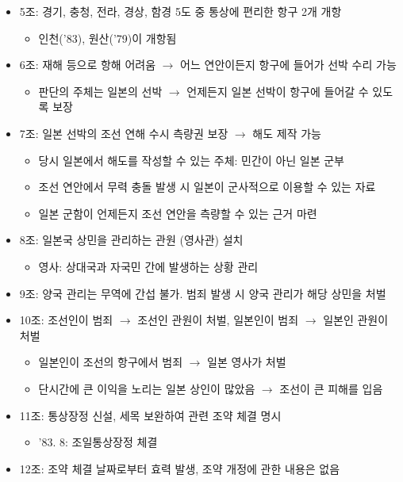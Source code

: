\begin{itemize}
\begin{itemize}
    \end{itemize}
    \newpage
    \item 5조: 경기, 충청, 전라, 경상, 함경 5도 중 통상에 편리한 항구 2개 개항
    \begin{itemize}
        \item 인천('83), 원산('79)이 개항됨
    \end{itemize}
    \item 6조: 재해 등으로 항해 어려움 $\rightarrow$ 어느 연안이든지 항구에 들어가 선박 수리 가능
    \begin{itemize}
        \item 판단의 주체는 일본의 선박 $\rightarrow$ 언제든지 일본 선박이 항구에 들어갈 수 있도록 보장
    \end{itemize}
    \item 7조: 일본 선박의 조선 연해 수시 측량권 보장 $\rightarrow$ 해도 제작 가능
    \begin{itemize}
        \item 당시 일본에서 해도를 작성할 수 있는 주체: 민간이 아닌 일본 군부
        \item 조선 연안에서 무력 충돌 발생 시 일본이 군사적으로 이용할 수 있는 자료
        \item 일본 군함이 언제든지 조선 연안을 측량할 수 있는 근거 마련
    \end{itemize}
    \item 8조: 일본국 상민을 관리하는 관원 (영사관) 설치
    \begin{itemize}
        \item 영사: 상대국과 자국민 간에 발생하는 상황 관리
    \end{itemize}
    \item 9조: 양국 관리는 무역에 간섭 불가. 범죄 발생 시 양국 관리가 해당 상민을 처벌
    \item 10조: 조선인이 범죄 $\rightarrow$ 조선인 관원이 처벌, 일본인이 범죄 $\rightarrow$ 일본인 관원이 처벌
    \begin{itemize}
        \item 일본인이 조선의 항구에서 범죄 $\rightarrow$ 일본 영사가 처벌
        \item 단시간에 큰 이익을 노리는 일본 상인이 많았음 $\rightarrow$ 조선이 큰 피해를 입음
    \end{itemize}
    \item 11조: 통상장정 신설, 세목 보완하여 관련 조약 체결 명시
    \begin{itemize}
        \item '83. 8: 조일통상장정 체결
    \end{itemize}
    \item 12조: 조약 체결 날짜로부터 효력 발생, 조약 개정에 관한 내용은 없음
\end{itemize}

